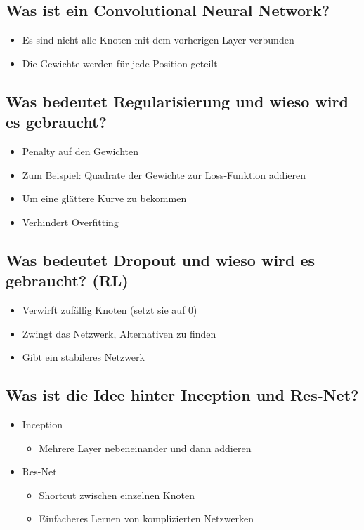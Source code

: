 \documentclass[a4paper]{article}
\begin{document}
		\subsection{Was ist ein Convolutional Neural Network?}
		
		\begin{itemize}
			\item Es sind nicht alle Knoten mit dem vorherigen Layer verbunden
			\item Die Gewichte werden für jede Position geteilt
		\end{itemize}
		
		\subsection{Was bedeutet Regularisierung und wieso wird es gebraucht?}
		
		\begin{itemize}
			\item Penalty auf den Gewichten
			\item Zum Beispiel: Quadrate der Gewichte zur Loss-Funktion addieren
			\item Um eine glättere Kurve zu bekommen
			\item Verhindert Overfitting
		\end{itemize}
	
		\subsection{Was bedeutet Dropout und wieso wird es gebraucht? (RL)}
		
		\begin{itemize}
			\item Verwirft zufällig Knoten (setzt sie auf 0)
			\item Zwingt das Netzwerk, Alternativen zu finden
			\item Gibt ein stabileres Netzwerk
		\end{itemize}
	
		\subsection{Was ist die Idee hinter Inception und Res-Net?}
		
		\begin{itemize}
			\item Inception
				\begin{itemize}
					\item Mehrere Layer nebeneinander und dann addieren
				\end{itemize}
			\item Res-Net
				\begin{itemize}
					\item Shortcut zwischen einzelnen Knoten
					\item Einfacheres Lernen von komplizierten Netzwerken
				\end{itemize}
		\end{itemize}
		
\end{document}
